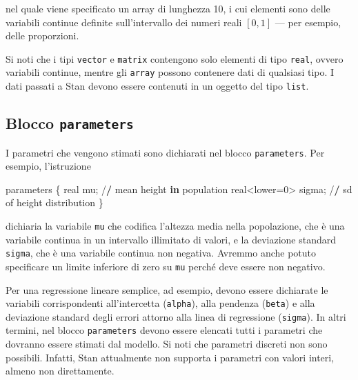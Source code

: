 \documentclass[
  10pt,
  italian,
  a4paper,
  extrafontsizes,onecolumn,openright
  ]{memoir}
\newenvironment{Shaded}{\begin{snugshade}}{\end{snugshade}}
\newcommand{\ControlFlowTok}[1]{\textcolor[rgb]{0.13,0.29,0.53}{\textbf{#1}}}
\newcommand{\DecValTok}[1]{\textcolor[rgb]{0.00,0.00,0.81}{#1}}
\newcommand{\ErrorTok}[1]{\textcolor[rgb]{0.64,0.00,0.00}{\textbf{#1}}}
\newcommand{\NormalTok}[1]{#1}
\newcommand{\OtherTok}[1]{\textcolor[rgb]{0.56,0.35,0.01}{#1}}
\newcommand{\SpecialCharTok}[1]{\textcolor[rgb]{0.00,0.00,0.00}{#1}}
\begin{document}
\noindent
nel quale viene specificato un array di lunghezza 10, i cui elementi sono delle variabili continue definite sull'intervallo dei numeri reali \([0, 1]\) --- per esempio, delle proporzioni.

Si noti che i tipi \texttt{vector} e \texttt{matrix} contengono solo elementi di tipo \texttt{real}, ovvero variabili continue, mentre gli \texttt{array} possono contenere dati di qualsiasi tipo. I dati passati a Stan devono essere contenuti in un oggetto del tipo \texttt{list}.

\hypertarget{blocco-parameters}{%
\subsection{\texorpdfstring{Blocco \texttt{parameters}}{Blocco parameters}}\label{blocco-parameters}}

I parametri che vengono stimati sono dichiarati nel blocco \texttt{parameters}. Per esempio, l'istruzione

\begin{Shaded}
\begin{Highlighting}[]
\NormalTok{parameters \{}
\NormalTok{  real mu; }\SpecialCharTok{/}\ErrorTok{/}\NormalTok{ mean height }\ControlFlowTok{in}\NormalTok{ population}
\NormalTok{  real}\SpecialCharTok{\textless{}}\NormalTok{lower}\OtherTok{=}\DecValTok{0}\SpecialCharTok{\textgreater{}}\NormalTok{ sigma; }\SpecialCharTok{/}\ErrorTok{/}\NormalTok{ sd of height distribution}
\NormalTok{\}}
\end{Highlighting}
\end{Shaded}

\noindent
dichiaria la variabile \texttt{mu} che codifica l'altezza media nella popolazione, che è una variabile continua in un intervallo illimitato di valori, e la deviazione standard \texttt{sigma}, che è una variabile continua non negativa. Avremmo anche potuto specificare un limite inferiore di zero su \texttt{mu} perché deve essere non negativo.

Per una regressione lineare semplice, ad esempio, devono essere dichiarate le variabili corrispondenti all'intercetta (\texttt{alpha}), alla pendenza (\texttt{beta}) e alla deviazione standard degli errori attorno alla linea di regressione (\texttt{sigma}). In altri termini, nel blocco \texttt{parameters} devono essere elencati tutti i parametri che dovranno essere stimati dal modello. Si noti che parametri discreti non sono possibili. Infatti, Stan attualmente non supporta i parametri con valori interi, almeno non direttamente.
\end{document}
